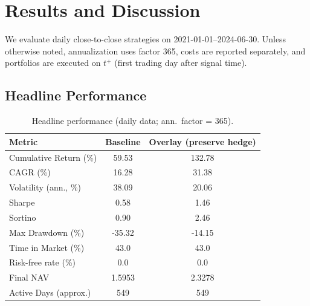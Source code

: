 
\newcommand{\annfac}{365}
\newcommand{\sampleStart}{2021-01-01}
\newcommand{\sampleEnd}{2024-06-30}
\newcommand{\neutralScale}{0.5}

\chapter{Results and Discussion}\label{sec:results}

We evaluate daily close-to-close strategies on \sampleStart{}–\sampleEnd{}.
Unless otherwise noted, annualization uses factor \annfac{}, costs are reported separately, and portfolios are executed on $t^+$ (first trading day after signal time).










\section{Headline Performance}\label{sec:results:headline}



\begin{table}[t]
\centering
\caption{Headline performance (daily data; ann.\ factor = \annfac). }
\label{tab:main}
\small
\begin{tabular}{lcc}
\toprule
Metric & Baseline & Overlay (preserve hedge) \\
\midrule
Cumulative Return (\%)     & 59.53 & 132.78 \\
CAGR (\%)                  & 16.28 & 31.38  \\
Volatility (ann., \%)      & 38.09 & 20.06  \\
Sharpe                     & 0.58  & 1.46   \\
Sortino                    & 0.90  & 2.46   \\
Max Drawdown (\%)          & -35.32 & -14.15 \\
Time in Market (\%)        & 43.0  & 43.0   \\
Risk-free rate (\%)        & 0.0   & 0.0    \\
Final NAV                  & 1.5953 & 2.3278 \\
Active Days (approx.)      & 549   & 549    \\
\bottomrule
\end{tabular}
\end{table}

